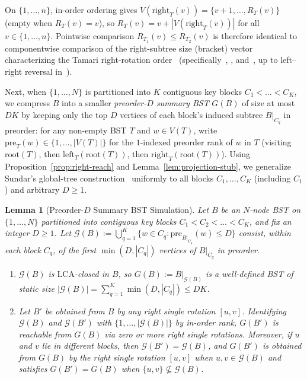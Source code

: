 \documentclass[11pt]{article}
\newtheorem{lemma}[theorem]{Lemma}
\theoremstyle{definition}
\theoremstyle{remark}
\newcommand{\LCA}{\mathrm{LCA}}
\begin{document}
On $\{1, \dots, n\}$, in-order ordering gives $V(\mathrm{right}_T(v)) = \{v + 1, \dots, R_T(v)\}$ (empty when $R_T(v) = v$), so $R_T(v) = v + |V(\mathrm{right}_T(v))|$ for all $v \in \{1, \dots, n\}$. Pointwise comparison $R_{T_1}(v) \le R_{T_2}(v)$ is therefore identical to componentwise comparison of the right-subtree size (bracket) vector characterizing the Tamari right-rotation order~\cite{Tamari1962,FriedmanTamari1967} (specifically~\cite{HuangTamari1972,Pallo1986}, \cite[Section~9]{BjornerWachs1997}, and~\cite[Section~7.2.1.6]{Knuth2011Vol4A}, up to left--right reversal in~\cite{Pallo1986}).

Next, when $\{1, \dots, N\}$ is partitioned into $K$ contiguous key blocks $C_1 < \dots < C_K$, we compress $B$ into a smaller \emph{preorder-$D$ summary BST} $G(B)$ of size at most $D K$ by keeping only the top $D$ vertices of each block's induced subtree $B|_{C_q}$ in preorder: for any non-empty BST $T$ and $w \in V(T)$, write $\mathrm{pre}_T(w) \in \{1, \dots, |V(T)|\}$ for the $1$-indexed preorder rank of $w$ in $T$ (visiting $\mathrm{root}(T)$, then $\mathrm{left}_T(\mathrm{root}(T))$, then $\mathrm{right}_T(\mathrm{root}(T))$). Using Proposition~\ref{prop:right-reach} and Lemma~\ref{lem:projection-stub}, we generalize Sundar's global-tree construction~\cite[Section~4.2, Theorem~8]{Sundar1992} uniformly to all blocks $C_1, \dots, C_K$ (including $C_1$) and arbitrary $D \ge 1$.

\begin{lemma}[Preorder-$D$ Summary BST Simulation]
\label{lem:preorder-global}
Let $B$ be an $N$-node BST on $\{1, \dots, N\}$ partitioned into contiguous key blocks $C_1 < C_2 < \dots < C_K$, and fix an integer $D \ge 1$. Let $\mathcal{G}(B) := \bigcup_{q=1}^K \big\{w \in C_q : \mathrm{pre}_{B|_{C_q}}(w) \le D\big\}$ consist, within each block $C_q$, of the first $\min(D, |C_q|)$ vertices of $B|_{C_q}$ in preorder.
\begin{enumerate}[label=(\arabic*)]
  \item $\mathcal{G}(B)$ is $\LCA$-closed in $B$, so $G(B) := B|_{\mathcal{G}(B)}$ is a well-defined BST of static size $|\mathcal{G}(B)| = \sum_{q=1}^K \min(D, |C_q|) \le D K$.
  \item Let $B'$ be obtained from $B$ by any right single rotation $[u, v]$. Identifying $\mathcal{G}(B)$ and $\mathcal{G}(B')$ with $\{1, \dots, |\mathcal{G}(B)|\}$ by in-order rank, $G(B')$ is reachable from $G(B)$ via zero or more right single rotations. Moreover, if $u$ and $v$ lie in different blocks, then $\mathcal{G}(B') = \mathcal{G}(B)$, and $G(B')$ is obtained from $G(B)$ by the right single rotation $[u, v]$ when $u, v \in \mathcal{G}(B)$ and satisfies $G(B') = G(B)$ when $\{u, v\} \not\subseteq \mathcal{G}(B)$.
\end{enumerate}
\end{lemma}
\end{document}
